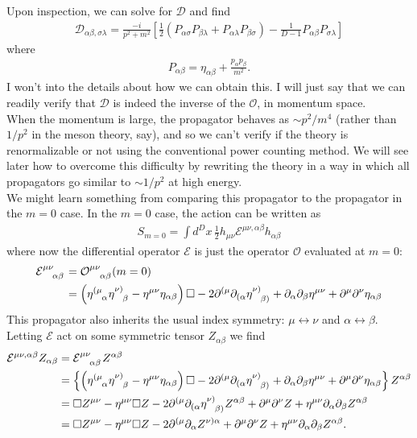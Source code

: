 \documentclass{book}
\theoremstyle{definition}
\newcommand{\p}{\partial}
\newcommand{\nn}{\nonumber}
\newcommand{\al}{\alpha}
\newcommand{\be}{\beta}
\newcommand{\f}[2]{\frac{#1}{#2}}
\newcommand{\lp}{\left(}
\newcommand{\rp}{\right)}
\newcommand{\lb}{\left[}
\newcommand{\rb}{\right]}
\newcommand{\lc}{\left\{}
\newcommand{\rc}{\right\}}
\newcommand{\D}{\mathcal{D}}
\begin{document}
Upon inspection, we can solve for $\D$ and find
\begin{align}
\boxed{\D_{\alpha\beta,\sigma\lambda} = \f{-i}{p^2 +m^2}\lb \f{1}{2}\lp P_{\alpha\sigma}P_{\beta\lambda} + P_{\alpha\lambda}P_{\beta\sigma} \rp - \f{1}{D-1}P_{\alpha\beta}P_{\sigma\lambda} \rb}
\end{align}
where
\begin{align}
P_{\alpha\beta} = \eta_{\alpha\beta} + \f{p_\alpha p_\beta}{m^2}.
\end{align}
I won't into the details about how we can obtain this. I will just say that we can readily verify that $\D$ is indeed the inverse of the $\mathcal{O}$, in momentum space. \\

When the momentum is large, the propagator behaves as $\sim p^2 / m^4$ (rather than $1/p^2$ in the meson theory, say), and so we can't verify if the theory is renormalizable or not using the conventional power counting method. We will see later how to overcome this difficulty by rewriting the theory in a way in which all propagators go similar to $\sim 1/p^2$ at high energy.   \\

We might learn something from comparing this propagator to the propagator in the $m=0$ case. In the $m=0$ case, the action can be written as
\begin{align}
S_{m=0} = \int d^Dx\, \f{1}{2}h_{\mu\nu}\mathcal{E}^{\mu\nu,\alpha\beta}h_{\al\be}
\end{align} 
where now the differential operator $\mathcal{E}$ is just the operator $\mathcal{O}$ evaluated at $m=0$:
\begin{align}
\tensor{\mathcal{E}}{^{\mu\nu}_{\alpha\beta}} &= \tensor{\mathcal{O}}{^{\mu\nu}_{\alpha\beta}}({m=0})\nn\\
&=  \lp \tensor{\eta}{^{(\mu}_\alpha}\tensor{\eta}{^{\nu)}_\beta}  - \eta^{\mu\nu}\eta_{\alpha\beta} \rp \square -2\p^{(\mu} \p_{(\alpha} \tensor{\eta}{^{\nu)}_{\beta)}} + \p_\alpha \p_\beta \eta^{\mu\nu} + \p^\mu\p^\nu \eta_{\alpha\beta}
\end{align}
This propagator also inherits the usual index symmetry: $\mu \leftrightarrow \nu$ and $\alpha \leftrightarrow \beta$. Letting $\mathcal{E}$ act on some symmetric tensor $Z_{\alpha\beta}$ we find
\begin{align}
\mathcal{E}^{\mu\nu,\alpha\beta}Z_{\alpha\beta} &= \tensor{\mathcal{E}}{^{\mu\nu}_{\alpha\beta}}Z^{\alpha\beta}\nn\\
&= \lc\lp \tensor{\eta}{^{(\mu}_\alpha}\tensor{\eta}{^{\nu)}_\beta}  - \eta^{\mu\nu}\eta_{\alpha\beta} \rp \square -2\p^{(\mu} \p_{(\alpha} \tensor{\eta}{^{\nu)}_{\beta)}} + \p_\alpha \p_\beta \eta^{\mu\nu} + \p^\mu\p^\nu \eta_{\alpha\beta}\rc Z^{\alpha\beta}\nn\\
&= \square Z^{\mu\nu} - \eta^{\mu\nu}\square Z -2\p^{(\mu} \p_{(\alpha} \tensor{\eta}{^{\nu)}_{\beta)}}Z^{\alpha\beta} + \p^\mu\p^\nu Z + \eta^{\mu\nu}\p_\alpha\p_\beta Z^{\alpha\beta}\nn\\
&= \square Z^{\mu\nu} - \eta^{\mu\nu}\square Z -2\p^{(\mu} \p_{\alpha} \tensor{Z}{^{\nu)\alpha}} + \p^\mu\p^\nu Z + \eta^{\mu\nu}\p_\alpha\p_\beta Z^{\alpha\beta}.
\end{align}
\end{document}
